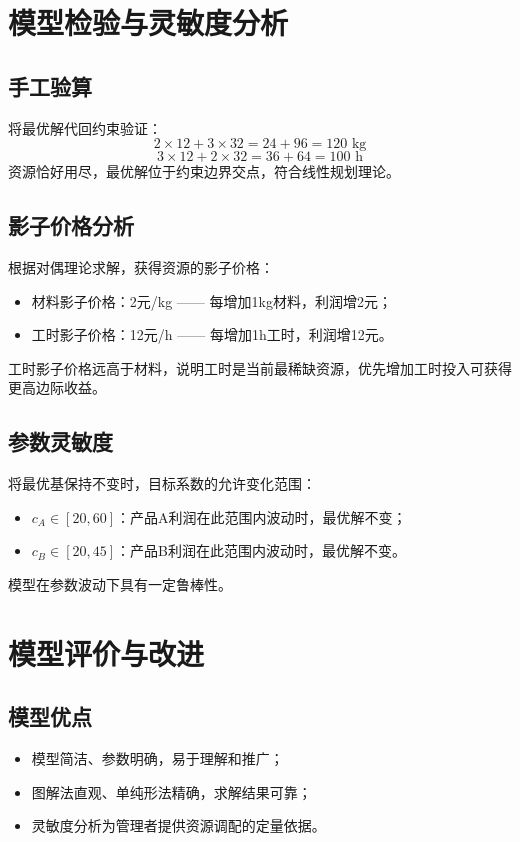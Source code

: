 \documentclass[12pt,a4paper]{ctexart}
\begin{document}
\section{模型检验与灵敏度分析}
\subsection{手工验算}
将最优解代回约束验证：
\[2\times12+3\times32 = 24+96 = 120\text{ kg}\]
\[3\times12+2\times32 = 36+64 = 100\text{ h}\]
资源恰好用尽，最优解位于约束边界交点，符合线性规划理论。

\subsection{影子价格分析}
根据对偶理论求解，获得资源的影子价格：
\begin{itemize}
\item 材料影子价格：2元/kg —— 每增加1kg材料，利润增2元；
\item 工时影子价格：12元/h —— 每增加1h工时，利润增12元。
\end{itemize}
工时影子价格远高于材料，说明工时是当前最稀缺资源，优先增加工时投入可获得更高边际收益。

\subsection{参数灵敏度}
将最优基保持不变时，目标系数的允许变化范围：
\begin{itemize}
\item $c_A\in[20, 60]$：产品A利润在此范围内波动时，最优解不变；
\item $c_B\in[20, 45]$：产品B利润在此范围内波动时，最优解不变。
\end{itemize}
模型在参数波动下具有一定鲁棒性。

\section{模型评价与改进}
\subsection{模型优点}
\begin{itemize}
\item 模型简洁、参数明确，易于理解和推广；
\item 图解法直观、单纯形法精确，求解结果可靠；
\item 灵敏度分析为管理者提供资源调配的定量依据。
\end{itemize}
\end{document}
